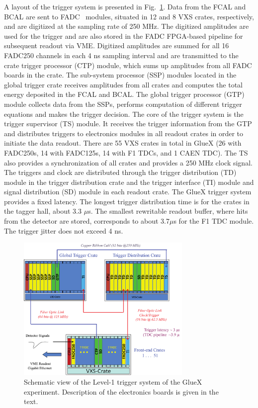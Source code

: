 A layout of the trigger system is presented in Fig.~\ref{fig:trig}. Data from the FCAL and BCAL are sent to  FADC~\cite{Dong:2007} modules, situated in 12 and 8 VXS crates, respectively, and are digitized at the sampling rate of 250 MHz. The digitized amplitudes are used for the trigger and are also stored in the FADC FPGA-based pipeline for subsequent readout via VME.
Digitized amplitudes are summed for all 16 FADC250 channels in each 4 ns sampling interval and are transmitted to the crate trigger processor (CTP) module, which sums up amplitudes from all FADC boards in the crate. The sub-system processor (SSP) modules located in the global trigger crate receives amplitudes from all crates and computes the total energy deposited in the FCAL and BCAL. The global trigger processor (GTP) module collects data from the SSPs, performs computation of different trigger equations and makes the trigger decision. The core of the trigger system is the trigger supervisor (TS) module. It receives the trigger information from the GTP and distributes triggers to electronics modules in all readout 
crates in order to initiate the data readout. There are 55 VXS crates in total in GlueX (26 with FADC250s, 14 with  FADC125s, 14 with F1 TDCs, and 1 CAEN TDC). The TS also provides a synchronization of all crates and provides a 250 MHz clock signal. The triggers and clock are distributed through the trigger distribution (TD) module in the trigger distribution crate and the trigger interface (TI) module and signal distribution (SD) module in each readout crate. The GlueX trigger system provides a fixed latency. The longest trigger distribution time is for the crates in the tagger hall, about 3.3 $\mu$s. 
The smallest rewritable readout buffer, where hits from the detector are stored, corresponds to about 3.7$\mu$s for the F1 TDC module. The trigger jitter does not exceed 4 ns.


\begin{figure}[tbp]
\begin{center}
\includegraphics[width=0.75\textwidth]{figures/125_Somov-f1.pdf}  
\caption{Schematic view of the Level-1 trigger system of the GlueX experiment. Description of the electronics boards is given in the text.} \label{fig:trig}
\end{center}
\end{figure}

